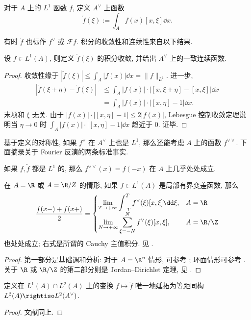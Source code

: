 对于 $A$ 上的 $L^1$ 函数 $f$, 定义 $A^\vee$ 上函数
\[ \check{f}(\xi) := \int_A f(x) [x, \xi] \dd x. \]

有时 $\check{f}$ 也标作 $f^{\vee}$ 或 $\mathcal{F}f$. 积分的收敛性和连续性来自以下结果.

\begin{lemma}\label{prop:Fourier-continuity}
	设 $f \in L^1(A)$, 则定义 $\check{f}(\xi)$ 的积分收敛, 并给出 $A^\vee$ 上的一致连续函数.
\end{lemma}
\begin{proof}
	收敛性缘于 $|\check{f}(\xi)| \leq \int_A |f(x)| \dd x = \|f\|_{L^1}$. 进一步,
	\begin{align*}
		\left|\check{f}(\xi+\eta) - \check{f}(\xi) \right| & \leq \int_A |f(x)| \cdot \bigg| [x, \xi+\eta] - [x, \xi] \bigg| \dd x \\
		& = \int_A |f(x)| \cdot \bigg| [x, \eta] - 1 \bigg| \dd x.
	\end{align*}
	末项和 $\xi$ 无关. 由于 $|f(x)| \cdot \left| [x, \eta] - 1 \right| \leq 2|f(x)|$, Lebesgue 控制收敛定理说明当 $\eta \to 0$ 时 $\int_A |f(x)| \cdot \bigg| [x, \eta] - 1 \bigg| \dd x$ 趋近于 $0$. 证毕.
\end{proof}

基于定义的对称性, 如果 $f^\vee$ 在 $A^\vee$ 上也是 $L^1$, 那么还能考虑 $A$ 上的函数 $f^{\vee\vee}$. 下面摘录关于 Fourier 反演的两条标准事实.
\begin{theorem}[Fourier 反演]\label{prop:Fourier-inversion}
	如果 $f, \check{f}$ 都是 $L^1$ 的, 那么 $f^{\vee\vee}(x) = f(-x)$ 在 $A$ 上几乎处处成立.
	
	在 $A = \R$ 或 $A = \R/Z$ 的情形, 如果 $f \in L^1(A)$ 是局部有界变差函数, 那么
	\[ \frac{f(x-) + f(x+)}{2} = \begin{cases}
		\displaystyle\lim_{T \to +\infty} \int_{-T}^{T} f^\vee(\xi) [x, \xi] \dd\xi, & A = \R \\
		\displaystyle\lim_{N \to +\infty} \sum_{\xi = -N}^N f^\vee(\xi) [x, \xi], & A = \R/\Z
	\end{cases}\]
	也处处成立; 右式是所谓的 Cauchy 主值积分. 见 \cite[\S 1.9, Theorem 3]{Ti86}.
\end{theorem}
\begin{proof}
	第一部分是基础调和分析: 对于 $A = \R^n$ 情形, 可参考 \cite[Exercise 2.2.6]{Gra14}; 环面情形可参考 \cite[Theorem 3.1.14]{Gra14}. 关于 $\R$ 或 $\R/\Z$ 的第二部分则是 Jordan--Dirichlet 定理, 见 \cite[\S 1.9, Theorem 3]{Ti86}.
\end{proof}

\begin{theorem}[Parseval 公式]\label{prop:Parseval}
	定义在 $L^1(A) \cap L^2(A)$ 上的变换 $f \mapsto \check{f}$ 唯一地延拓为等距同构 $L^2(A) \rightiso L^2(A^\vee)$.
\end{theorem}
\begin{proof}
	文献同上.
\end{proof}

